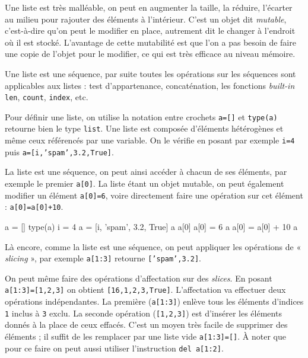 Une liste est très malléable, on peut en augmenter la taille, la réduire, l'écarter au milieu pour rajouter des éléments à l'intérieur. C'est un objet dit \textit{mutable}, c'est-à-dire qu'on peut le modifier en place, autrement dit le changer à l'endroit où il est stocké. L'avantage de cette mutabilité est que l'on a pas besoin de faire une copie de l'objet pour le modifier, ce qui est très efficace au niveau mémoire.

Une liste est une séquence, par suite toutes les opérations sur les séquences sont applicables aux listes : test d'appartenance, concaténation, les fonctions \textit{built-in} \texttt{len}, \texttt{count}, \texttt{index}, etc.

Pour définir une liste, on utilise la notation entre crochets \texttt{a=[]} et \texttt{type(a)} retourne bien le type \texttt{list}. Une liste est composée d'éléments hétérogènes et même ceux référencés par une variable. On le vérifie en posant par exemple \texttt{i=4} puis \texttt{a=[i,'spam',3.2,True]}.

La liste est une séquence, on peut ainsi accéder à chacun de ses éléments, par exemple le premier \texttt{a[0]}. La liste étant un objet mutable, on peut également modifier un élément \texttt{a[0]=6}, voire directement faire une opération sur cet élément : \texttt{a[0]=a[0]+10}.

\vspace{2pt}

\begin{idleconsole}
\begin{pyconsole}
a = []
type(a)
i = 4
a = [i, 'spam', 3.2, True]
a
a[0]
a[0] = 6
a
a[0] = a[0] + 10
a
\end{pyconsole}
\end{idleconsole}

\vspace{2pt}

Là encore, comme la liste est une séquence, on peut appliquer les opérations de « \textit{slicing} », par exemple \texttt{a[1:3]} retourne \texttt{['spam',3.2]}.

On peut même faire des opérations d'affectation sur des \textit{slices}. En posant \texttt{a[1:3]=[1,2,3]} on obtient \texttt{[16,1,2,3,True]}. L'affectation va effectuer deux opérations indépendantes. La première (\texttt{a[1:3]}) enlève tous les éléments d'indices \texttt{1} inclus à \texttt{3} exclu. La seconde opération (\texttt{[1,2,3]}) est d'insérer les éléments donnés à la place de ceux effacés. C'est un moyen très facile de supprimer des éléments ; il suffit de les remplacer par une liste vide \texttt{a[1:3]=[]}. À noter que pour ce faire on peut aussi utiliser l'instruction \texttt{del a[1:2]}.

